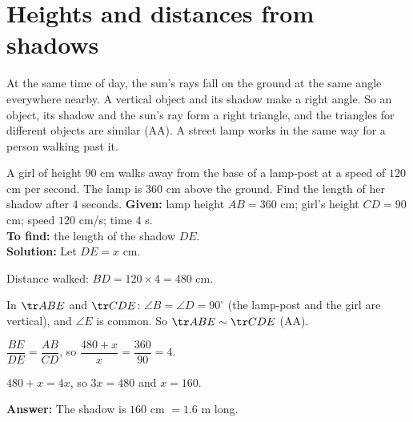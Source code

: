 \section{Heights and distances from shadows}

At the same time of day, the sun's rays fall on the ground at the same angle everywhere nearby. A vertical object and its shadow make a right angle. So an object, its shadow and the sun's ray form a right triangle, and the triangles for different objects are similar (AA). A street lamp works in the same way for a person walking past it.

\begin{example}
A girl of height $90$ cm walks away from the base of a lamp-post at a speed of $120$ cm per second. The lamp is $360$ cm above the ground. Find the length of her shadow after $4$ seconds.
\textbf{Given:} lamp height $AB=360$ cm; girl's height $CD=90$ cm; speed $120$ cm/s; time $4$ s.\\
\textbf{To find:} the length of the shadow $DE$.\\
\textbf{Solution:} Let $DE=x$ cm.
\begin{steps}
  \item Distance walked: $BD=120\times4=480$ cm.
  \item In $\tr ABE$ and $\tr CDE$: $\angle B=\angle D=90^\circ$ (the lamp-post and the girl are vertical), and $\angle E$ is common. So $\tr ABE\sim\tr CDE$ (AA).
  \item $\dfrac{BE}{DE}=\dfrac{AB}{CD}$, so $\dfrac{480+x}{x}=\dfrac{360}{90}=4$.
  \item $480+x=4x$, so $3x=480$ and $x=160$.
\end{steps}
\textbf{Answer:} The shadow is $160$ cm $=1.6$ m long.
\end{example}

